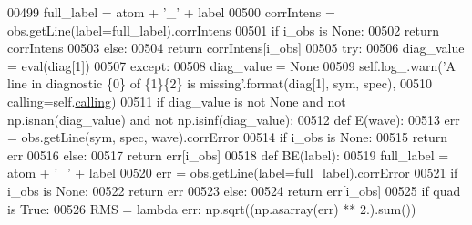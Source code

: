 \begin{DoxyCode}
00499                     full\_label = atom + \textcolor{stringliteral}{'\_'} + label
00500                     corrIntens = obs.getLine(label=full\_label).corrIntens
00501                     \textcolor{keywordflow}{if} i\_obs \textcolor{keywordflow}{is} \textcolor{keywordtype}{None}:
00502                         \textcolor{keywordflow}{return} corrIntens
00503                     \textcolor{keywordflow}{else}:
00504                         \textcolor{keywordflow}{return} corrIntens[i\_obs]
00505                 \textcolor{keywordflow}{try}:
00506                     diag\_value = eval(diag[1])
00507                 \textcolor{keywordflow}{except}:
00508                     diag\_value = \textcolor{keywordtype}{None}
00509                     self.log\_.warn(\textcolor{stringliteral}{'A line in diagnostic \{0\} of \{1\}\{2\} is missing'}.format(diag[1], sym, 
      spec),
00510                                    calling=self.\hyperlink{classpyneb_1_1core_1_1diags_1_1_diagnostics_a07dce673fec8b2383ef411ab94b0b2fe}{calling})
00511                 \textcolor{keywordflow}{if} diag\_value \textcolor{keywordflow}{is} \textcolor{keywordflow}{not} \textcolor{keywordtype}{None} \textcolor{keywordflow}{and} \textcolor{keywordflow}{not} np.isnan(diag\_value) \textcolor{keywordflow}{and} \textcolor{keywordflow}{not} np.isinf(diag\_value):
00512                     \textcolor{keyword}{def }E(wave):
00513                         err = obs.getLine(sym, spec, wave).corrError
00514                         \textcolor{keywordflow}{if} i\_obs \textcolor{keywordflow}{is} \textcolor{keywordtype}{None}:
00515                             \textcolor{keywordflow}{return} err
00516                         \textcolor{keywordflow}{else}:
00517                             \textcolor{keywordflow}{return} err[i\_obs]
00518                     \textcolor{keyword}{def }BE(label):
00519                         full\_label = atom + \textcolor{stringliteral}{'\_'} + label
00520                         err = obs.getLine(label=full\_label).corrError
00521                         \textcolor{keywordflow}{if} i\_obs \textcolor{keywordflow}{is} \textcolor{keywordtype}{None}:
00522                             \textcolor{keywordflow}{return} err
00523                         \textcolor{keywordflow}{else}:
00524                             \textcolor{keywordflow}{return} err[i\_obs]
00525                     \textcolor{keywordflow}{if} quad \textcolor{keywordflow}{is} \textcolor{keyword}{True}:
00526                         RMS = \textcolor{keyword}{lambda} err: np.sqrt((np.asarray(err) ** 2.).sum())

\end{DoxyCode}
